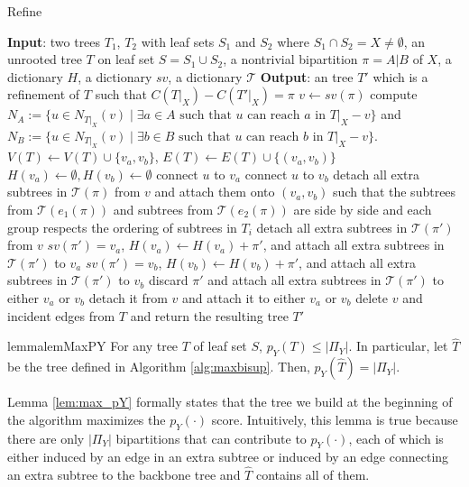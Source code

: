 \documentclass{bmcart}
\theoremstyle{mystyle}
\theoremstyle{proofstyle}
\begin{document}
\begin{algorithm}
    \caption{Refine}
    \label{alg:refine}
    \begin{algorithmic}[1]
        \Statex \textbf{Input}: two trees $T_1$, $T_2$ with leaf sets $S_1$ and $S_2$ where $S_1 \cap S_2 = X \neq \emptyset$, an unrooted tree $T$ on leaf set $S = S_1 \cup S_2$, a nontrivial bipartition $\pi = A|B$ of $X$, a dictionary $H$, a dictionary $sv$, a dictionary $\mathcal{T}$
        \Statex \textbf{Output}: an tree $T'$ which is a refinement of $T$ such that $C(T|_X) - C(T'|_X) = \pi$ 
        \State $v \gets sv(\pi)$
        \State compute $N_A:= \{u \in N_{T|_X}(v) \mid \text{$\exists a \in A$ such that $u$ can reach $a$ in $T|_X-v$}\}$ and $N_B:= \{u \in N_{T|_X}(v) \mid \text{$\exists b \in B$ such that $u$ can reach $b$ in $T|_X-v$}\}$.
        \State $V(T) \gets V(T) \cup \{v_a, v_b\}$, $E(T) \gets E(T) \cup \{(v_a,v_b)\}$
        \State $H(v_a) \gets \emptyset, H(v_b) \gets \emptyset$
             connect $u$ to $v_a$
            \Else{} connect $u$ to $v_b$
            \EndIf
        \EndFor
        \State detach all extra subtrees in $\mathcal{T}(\pi)$ from $v$ and attach them onto $(v_a,v_b)$ such that the subtrees from $\mathcal{T}(e_1(\pi))$ and subtrees from $\mathcal{T}(e_2(\pi))$ are side by side and each group respects the ordering of subtrees in $T_i$
            \State detach all extra subtrees in $\mathcal{T}(\pi')$ from $v$ 
                \State $sv(\pi') = v_a$, $H(v_a) \gets H(v_a) + \pi'$, and attach all extra subtrees in $\mathcal{T}(\pi')$ to $v_a$
                \State $sv(\pi') = v_b$, $H(v_b) \gets H(v_b) + \pi'$, and attach all extra subtrees in $\mathcal{T}(\pi')$ to $v_b$
            \Else{} 
                \State discard $\pi'$ and attach all extra subtrees in $\mathcal{T}(\pi')$ to either $v_a$ or $v_b$ 
            \EndIf
        \EndFor
            \State detach it from $v$ and attach it to either $v_a$ or $v_b$
        \EndFor
        \State delete $v$ and incident edges from $T$ and return the resulting tree $T'$
    \end{algorithmic}
\end{algorithm}
 



\begin{restatable}{lemma}{lemMaxPY}\label{lem:max_pY}
    For any tree $T$ of leaf set $S$, $p_Y(T) \le |\Pi_Y|$. In particular, let $\hat{T}$ be the tree defined in Algorithm \ref{alg:maxbisup}. Then, $p_Y(\hat{T}) = |\Pi_Y|$. 
\end{restatable}
Lemma \ref{lem:max_pY} formally states that the tree we build at the beginning of the algorithm maximizes the $p_Y(\cdot)$ score. Intuitively, this lemma is true because there are only $|\Pi_Y|$ bipartitions that can contribute to $p_Y(\cdot)$, each of which is either induced by an edge in an extra subtree or induced by an edge connecting an extra subtree to the backbone tree and $\hat{T}$ contains all of them. \smallskip
\end{document}
